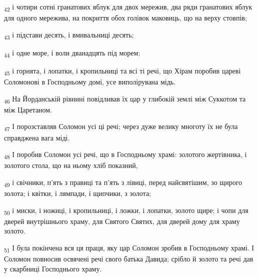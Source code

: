 \begin{tcolorbox}
\textsubscript{42} і чотири сотні гранатових яблук для двох мережив, два ряди гранатових яблук для одного мережива, на покриття обох голівок маковиць, що на верху стовпів;
\end{tcolorbox}
\begin{tcolorbox}
\textsubscript{43} і підстави десять, і вмивальниці десять;
\end{tcolorbox}
\begin{tcolorbox}
\textsubscript{44} і одне море, і воли дванадцять під морем;
\end{tcolorbox}
\begin{tcolorbox}
\textsubscript{45} і горнята, і лопатки, і кропильниці та всі ті речі, що Хірам поробив цареві Соломонові в Господньому домі, усе виполірувана мідь.
\end{tcolorbox}
\begin{tcolorbox}
\textsubscript{46} На Йорданській рівнині повідливав їх цар у глибокій землі між Суккотом та між Царетаном.
\end{tcolorbox}
\begin{tcolorbox}
\textsubscript{47} І порозставляв Соломон усі ці речі; через дуже велику многоту їх не була справджена вага міді.
\end{tcolorbox}
\begin{tcolorbox}
\textsubscript{48} І поробив Соломон усі речі, що в Господньому храмі: золотого жертівника, і золотого стола, що на ньому хліб показний,
\end{tcolorbox}
\begin{tcolorbox}
\textsubscript{49} і свічники, п'ять з правиці та п'ять з лівиці, перед найсвятішим, зо щирого золота; і квітки, і лямпади, і щипчики, з золота;
\end{tcolorbox}
\begin{tcolorbox}
\textsubscript{50} і миски, і ножиці, і кропильниці, і ложки, і лопатки, золото щире; і чопи для дверей внутрішнього храму, для Святого Святих, для дверей дому для храму золото.
\end{tcolorbox}
\begin{tcolorbox}
\textsubscript{51} І була покінчена вся ця праця, яку цар Соломон зробив в Господньому храмі. І Соломон повносив освячені речі свого батька Давида; срібло й золото та речі дав у скарбниці Господнього храму.
\end{tcolorbox}
